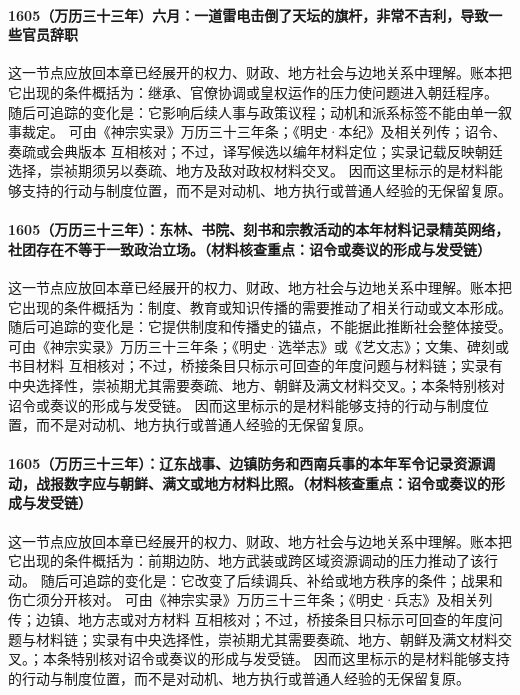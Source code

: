 \paragraph{1605（万历三十三年）六月：一道雷电击倒了天坛的旗杆，非常不吉利，导致一些官员辞职} 这一节点应放回本章已经展开的权力、财政、地方社会与边地关系中理解。账本把它出现的条件概括为：继承、官僚协调或皇权运作的压力使问题进入朝廷程序。 随后可追踪的变化是：它影响后续人事与政策议程；动机和派系标签不能由单一叙事裁定。 可由《神宗实录》万历三十三年条；《明史·本纪》及相关列传；诏令、奏疏或会典版本 互相核对；不过，译写候选以编年材料定位；实录记载反映朝廷选择，崇祯期须另以奏疏、地方及敌对政权材料交叉。 因而这里标示的是材料能够支持的行动与制度位置，而不是对动机、地方执行或普通人经验的无保留复原。

\paragraph{1605（万历三十三年）：东林、书院、刻书和宗教活动的本年材料记录精英网络，社团存在不等于一致政治立场。（材料核查重点：诏令或奏议的形成与发受链）} 这一节点应放回本章已经展开的权力、财政、地方社会与边地关系中理解。账本把它出现的条件概括为：制度、教育或知识传播的需要推动了相关行动或文本形成。 随后可追踪的变化是：它提供制度和传播史的锚点，不能据此推断社会整体接受。 可由《神宗实录》万历三十三年条；《明史·选举志》或《艺文志》；文集、碑刻或书目材料 互相核对；不过，桥接条目只标示可回查的年度问题与材料链；实录有中央选择性，崇祯期尤其需要奏疏、地方、朝鲜及满文材料交叉。；本条特别核对诏令或奏议的形成与发受链。 因而这里标示的是材料能够支持的行动与制度位置，而不是对动机、地方执行或普通人经验的无保留复原。

\paragraph{1605（万历三十三年）：辽东战事、边镇防务和西南兵事的本年军令记录资源调动，战报数字应与朝鲜、满文或地方材料比照。（材料核查重点：诏令或奏议的形成与发受链）} 这一节点应放回本章已经展开的权力、财政、地方社会与边地关系中理解。账本把它出现的条件概括为：前期边防、地方武装或跨区域资源调动的压力推动了该行动。 随后可追踪的变化是：它改变了后续调兵、补给或地方秩序的条件；战果和伤亡须分开核对。 可由《神宗实录》万历三十三年条；《明史·兵志》及相关列传；边镇、地方志或对方材料 互相核对；不过，桥接条目只标示可回查的年度问题与材料链；实录有中央选择性，崇祯期尤其需要奏疏、地方、朝鲜及满文材料交叉。；本条特别核对诏令或奏议的形成与发受链。 因而这里标示的是材料能够支持的行动与制度位置，而不是对动机、地方执行或普通人经验的无保留复原。

